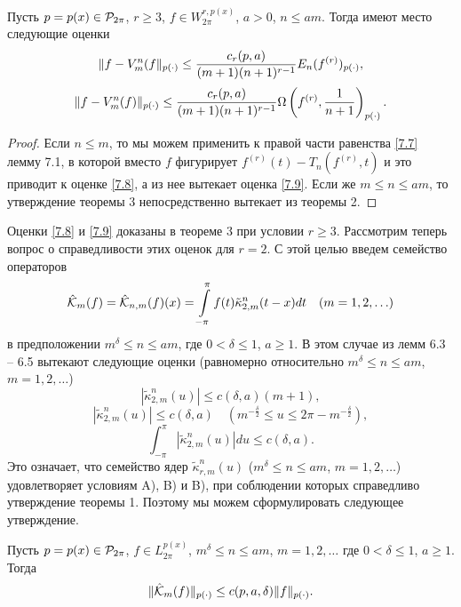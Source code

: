 \begin{theorem}\label{t3}
Пусть  $p=p(x)\in{\cal  P}_{2\pi}$, $r\ge3$, $f\in W^{r,p(x)}_{2\pi}$, $a>0$, $ n\le am$. Тогда имеют место следующие оценки
\begin{equation}\label{7.8}
   \|f-V_m^n(f\|_{p(\cdot)}\le {c_r(p,a)\over(m+1) (n+1)^{r-1}}E_n(f^{(r)})_{p(\cdot)},
\end{equation}
\begin{equation}\label{7.9}
   \|f-V_m^n(f)\|_{p(\cdot)}\le {c_r(p,a)\over(m+1) (n+1)^{r-1}}\Omega\left(f^{(r)},\frac1{n+1}\right)_{p(\cdot)}.
\end{equation}
\end{theorem}
\begin{proof}
Если $n\le m$, то мы можем применить к правой части равенства \eqref{7.7} лемму 7.1, в которой вместо $f$ фигурирует $f^{(r)}(t)-T_n(f^{(r)},t)$ и это приводит к оценке \eqref{7.8}, а из нее вытекает оценка \eqref{7.9}. Если же $m\le n\le am$, то утверждение
теоремы 3 непосредственно вытекает из теоремы 2.
\end{proof}
Оценки \eqref{7.8} и  \eqref{7.9} доказаны в теореме 3 при условии $r\ge3$.
Рассмотрим теперь вопрос о справедливости этих оценок для $r=2$. С этой целью введем семейство операторов
\begin{equation}\label{7.10}
    \hat{\cal K}_m(f)=\hat{\cal K}_{n,m}(f)(x)=
\int\limits_{-\pi}^{\pi}f(t)\tilde\kappa_{2,m}^{n}(t-x)dt\quad(m=1,2,\ldots)
\end{equation}
в предположении $m^\delta\le n\le am$, где $0<\delta\le 1$, $a\ge1$. В этом случае из лемм 6.3 -- 6.5 вытекают следующие оценки (равномерно относительно $m^\delta\le n\le am$, $m=1,2,\ldots$)
 $$
 |\tilde\kappa_{2,m}^{n}(u)|\le c(\delta,a)(m+1),
 $$
$$
 |\tilde\kappa_{2,m}^{n}(u)|\le c(\delta,a) \quad (m^{-\frac\delta2}\le u\le2\pi-m^{-\frac\delta2}),
 $$
$$
\int_{-\pi}^\pi |\tilde\kappa_{2,m}^{n}(u)|du \le c(\delta,a).
$$
Это означает, что семейство ядер $ \tilde\kappa_{r,m}^{n}(u)$ ($m^\delta\le n\le am$, $m=1,2,\ldots$) удовлетворяет условиям A), B) и B), при соблюдении которых справедливо утверждение теоремы 1. Поэтому мы можем сформулировать следующее утверждение.
\begin{lemma}\label{l7.2}
 Пусть $p=p(x)\in{\cal P}_{2\pi}$, $f\in L^{p(x)}_{2\pi}$, $m^\delta\le n\le am$, $m=1,2,\ldots$ где $0<\delta\le 1$, $a\ge1$. Тогда
$$\|\hat{\cal K}_{m}(f)\|_{p(\cdot)}\le c(p,a,\delta)\|f\|_{p(\cdot)}.$$
  \end{lemma}


